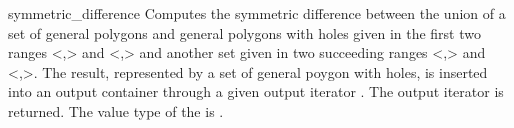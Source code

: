 \begin{ccRefFunction}{symmetric_difference}
{Computes the symmetric difference between the union of a set of general 
polygons and general polygons with holes given in the first two ranges
<,> and <,> and another
set given in two succeeding ranges <,> and
<,>. The result, represented by a set
of general poygon with holes, is inserted into an output container
through a given output iterator . The output iterator is
returned. The value type of the  is
.}

\ccSeeAlso
{}\\
\\
\\

\end{ccRefFunction}

\ccRefPageEnd
